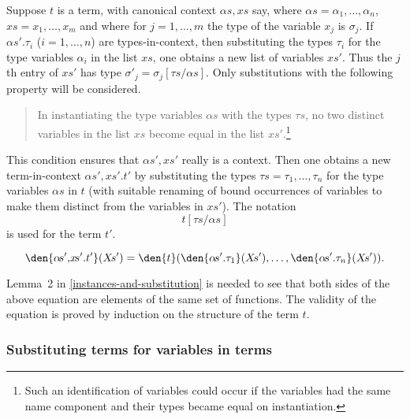 Suppose $t$ is a term, with canonical context $\alpha\!s,\!x\!s$ say,
where $\alpha\!s = \alpha_1,\ldots,\alpha_n$, $x\!s = x_1,\ldots,x_m$ 
and where for $j=1,\ldots,m$ the type of the variable $x_j$ is
$\sigma_j$. If $\alpha\!s'.\tau_{i}$ ($i=1,\ldots,n$) are
types-in-context, then substituting the types
$\tau_{i}$ for the type variables $\alpha_{i}$ in the list $x\!s$, one
obtains a new list of variables $x\!s'$. Thus the $j$\/th entry of
$x\!s'$ has type $\sigma'_{j} = \sigma_{j}[\tau\!s/\alpha\!s]$. Only
substitutions with the following property will be considered.  
\begin{quote}  
In instantiating the type variables $\alpha\!s$ with the types
$\tau\!s$, no two distinct variables in the list $x\!s$ become equal in
the list $x\!s'$.\footnote{Such an identification of variables could
occur if the variables had the same name component and their types
became equal on instantiation.}  
\end{quote}  
This condition ensures that $\alpha\!s',x\!s'$ really is a context. Then
one obtains a new term-in-context $\alpha\!s',\!x\!s'.t'$ by
substituting the types $\tau\!s=\tau_{1},\ldots,\tau_{n}$ for the type
variables $\alpha\!s$ in $t$ (with suitable renaming of bound
occurrences of variables to make them distinct from the variables in
$x\!s'$). The notation 
\[ 
t[\tau\!s/\alpha\!s]  
\]  
is used for the term $t'$. 

\medskip

\[
\den{\alpha\!s',\!x\!s'.t'}(X\!s') = 
   \den{t}(\den{\alpha\!s'.\tau_{1}}(X\!s'),\ldots,
   \den{\alpha\!s'.\tau_{n}}(X\!s')).
\]

\medskip

Lemma~2 in \ref{instances-and-substitution} is needed to see that both
sides of the above equation are elements of the same set of functions.
The validity of the equation is proved by induction on the structure
of the term $t$.

\subsubsection*{Substituting terms for variables in terms}

